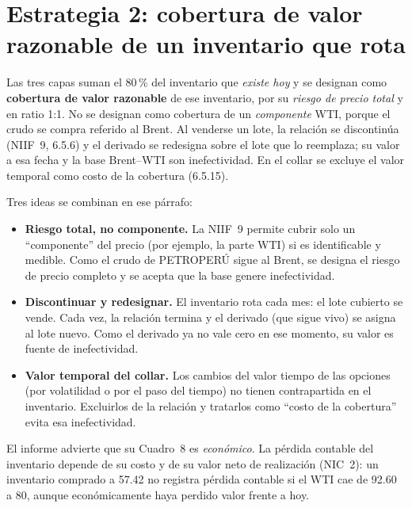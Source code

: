 \section{Estrategia 2: cobertura de valor razonable de un inventario que rota}

\begin{informe}
Las tres capas suman el 80\,\% del inventario que \emph{existe hoy} y se designan como \textbf{cobertura de valor razonable} de ese inventario, por su \emph{riesgo de precio total} y en ratio 1:1. No se designan como cobertura de un \emph{componente} WTI, porque el crudo se compra referido al Brent. Al venderse un lote, la relación se discontinúa (NIIF~9, 6.5.6) y el derivado se redesigna sobre el lote que lo reemplaza; su valor a esa fecha y la base Brent--WTI son inefectividad. En el collar se excluye el valor temporal como costo de la cobertura (6.5.15).
\end{informe}

Tres ideas se combinan en ese párrafo:
\begin{itemize}
\item \textbf{Riesgo total, no componente.} La NIIF~9 permite cubrir solo un \enquote{componente} del precio (por ejemplo, la parte WTI) si es identificable y medible. Como el crudo de PETROPERÚ sigue al Brent, se designa el riesgo de precio completo y se acepta que la base genere inefectividad.
\item \textbf{Discontinuar y redesignar.} El inventario rota cada mes: el lote cubierto se vende. Cada vez, la relación termina y el derivado (que sigue vivo) se asigna al lote nuevo. Como el derivado ya no vale cero en ese momento, su valor es fuente de inefectividad.
\item \textbf{Valor temporal del collar.} Los cambios del valor tiempo de las opciones (por volatilidad o por el paso del tiempo) no tienen contrapartida en el inventario. Excluirlos de la relación y tratarlos como \enquote{costo de la cobertura} evita esa inefectividad.
\end{itemize}

\begin{cuidado}
El informe advierte que su Cuadro~8 es \emph{económico}. La pérdida contable del inventario depende de su costo y de su valor neto de realización (NIC~2): un inventario comprado a 57.42 no registra pérdida contable si el WTI cae de 92.60 a 80, aunque económicamente haya perdido valor frente a hoy.
\end{cuidado}

